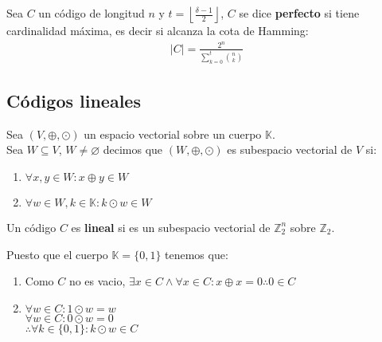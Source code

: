 \begin{definition}
Sea $C$ un código de longitud $n$ y $t = \left\lfloor{\frac{\delta - 1}{2}}\right\rfloor$, $C$ se dice \textbf{perfecto} si tiene cardinalidad máxima, es decir si alcanza la cota de Hamming:
\begin{align}
|C| = \frac{\displaystyle{2^n}}{\displaystyle\sum\limits_{k=0}^t {\displaystyle\binom{n}{k}}}
\end{align}
\end{definition}

\subsection{Códigos lineales}

\begin{definition}
Sea $(V, \oplus, \odot)$ un espacio vectorial sobre un cuerpo $\mathbb{K}$.\\
Sea $W \subseteq V$, $W \neq \varnothing$ decimos que $(W, \oplus, \odot)$ es subespacio vectorial de $V$ si:
\begin{enumerate}
\item $\forall x, y \in W : x \oplus y \in W$
\item $\forall w \in W, k \in \mathbb{K} : k\odot w \in W$
\end{enumerate}
\end{definition}
\begin{definition}
Un código $C$ es \textbf{lineal} si es un subespacio vectorial de ${\mathbb{Z}_2^n}$ sobre $\mathbb{Z}_2$.
\end{definition}
Puesto que el cuerpo $\mathbb{K} = \{0,1\}$ tenemos que:
\begin{enumerate}
\item Como $C$ no es vacio, $\exists x \in C \wedge \forall x \in C: x \oplus x = 0 \therefore 0 \in C$
\item $\forall w \in C: 1\odot w = w$ \\
$\forall w \in C: 0 \odot w = 0$\\
$\therefore \forall k \in \{0,1\} : k \odot w \in C$
\end{enumerate}

